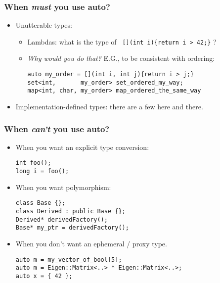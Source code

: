 \begin{frame}[fragile]
\end{frame}

\begin{frame}[fragile]
\frametitle{When \emph{must} you use auto?}

\begin{itemize} %
\item Unutterable types:
  \begin{itemize} %
    \item Lambdas: what is the type of {\scriptsize\texttt{  [](int i)\{return i > 42;\}}} ?
    \item \emph{Why would you do that?}  E.G., to
      be consistent with ordering:
{\scriptsize
\begin{verbatim}
auto my_order = [](int i, int j){return i > j;}
set<int,       my_order> set_ordered_my_way;
map<int, char, my_order> map_ordered_the_same_way
\end{verbatim}
}

  \end{itemize} %
\vskip 12pt
\item Implementation-defined types: there are a few here and there.

\end{itemize} %

\end{frame}

\begin{frame}[fragile]
\frametitle{When \emph{can't} you use auto?}

\begin{itemize} %
\item When you want an explicit type conversion:
{\scriptsize
\begin{verbatim}
int foo();
long i = foo();
\end{verbatim}
}
\vskip 6pt

\item When you want polymorphism:
{\scriptsize
\begin{verbatim}
class Base {};
class Derived : public Base {};
Derived* derivedFactory();
Base* my_ptr = derivedFactory();
\end{verbatim} }
\vskip 6pt
\item When you don't want an ephemeral / proxy type.
{\scriptsize
\begin{verbatim}
auto m = my_vector_of_bool[5];
auto m = Eigen::Matrix<..> * Eigen::Matrix<..>;
auto x = { 42 };
\end{verbatim}
}


\end{itemize} %
\end{frame}

